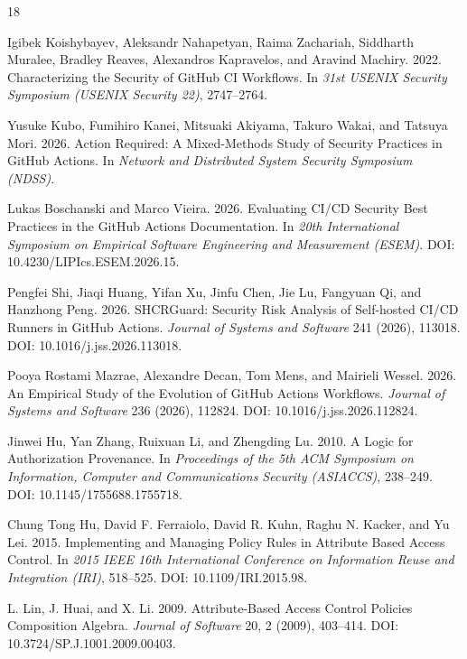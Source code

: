 \documentclass[sigconf,review,anonymous]{acmart}
\begin{document}

\begin{thebibliography}{18}

Igibek Koishybayev, Aleksandr Nahapetyan, Raima Zachariah, Siddharth Muralee,
Bradley Reaves, Alexandros Kapravelos, and Aravind Machiry. 2022.
Characterizing the Security of GitHub CI Workflows. In \emph{31st USENIX
Security Symposium (USENIX Security 22)}, 2747--2764.

Yusuke Kubo, Fumihiro Kanei, Mitsuaki Akiyama, Takuro Wakai, and Tatsuya Mori.
2026. Action Required: A Mixed-Methods Study of Security Practices in GitHub
Actions. In \emph{Network and Distributed System Security Symposium (NDSS)}.

Lukas Boschanski and Marco Vieira. 2026. Evaluating CI/CD Security Best
Practices in the GitHub Actions Documentation. In \emph{20th International
Symposium on Empirical Software Engineering and Measurement (ESEM)}.
DOI: 10.4230/LIPIcs.ESEM.2026.15.

Pengfei Shi, Jiaqi Huang, Yifan Xu, Jinfu Chen, Jie Lu, Fangyuan Qi, and Hanzhong
Peng. 2026. SHCRGuard: Security Risk Analysis of Self-hosted CI/CD Runners in
GitHub Actions. \emph{Journal of Systems and Software} 241 (2026), 113018.
DOI: 10.1016/j.jss.2026.113018.

Pooya Rostami Mazrae, Alexandre Decan, Tom Mens, and Mairieli Wessel. 2026. An
Empirical Study of the Evolution of GitHub Actions Workflows. \emph{Journal of
Systems and Software} 236 (2026), 112824. DOI: 10.1016/j.jss.2026.112824.

Jinwei Hu, Yan Zhang, Ruixuan Li, and Zhengding Lu. 2010. A Logic for
Authorization Provenance. In \emph{Proceedings of the 5th ACM Symposium on
Information, Computer and Communications Security (ASIACCS)}, 238--249.
DOI: 10.1145/1755688.1755718.

Chung Tong Hu, David F. Ferraiolo, David R. Kuhn, Raghu N. Kacker, and Yu Lei.
2015. Implementing and Managing Policy Rules in Attribute Based Access Control.
In \emph{2015 IEEE 16th International Conference on Information Reuse and
Integration (IRI)}, 518--525. DOI: 10.1109/IRI.2015.98.

L. Lin, J. Huai, and X. Li. 2009. Attribute-Based Access Control Policies
Composition Algebra. \emph{Journal of Software} 20, 2 (2009), 403--414.
DOI: 10.3724/SP.J.1001.2009.00403.


\end{thebibliography}
\end{document}
